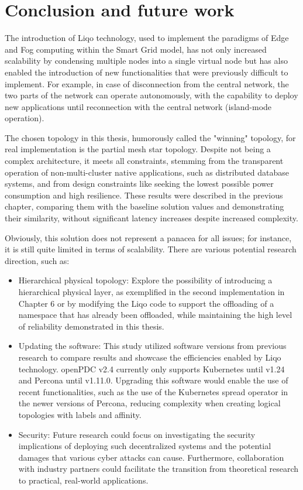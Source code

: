 \chapter{Conclusion and future work}
The introduction of Liqo technology, used to implement the paradigms of Edge and Fog computing within the Smart Grid model, has not only increased scalability by condensing multiple nodes into a single virtual node but has also enabled the introduction of new functionalities that were previously difficult to implement. For example, in case of disconnection from the central network, the two parts of the network can operate autonomously, with the capability to deploy new applications until reconnection with the central network (island-mode operation).

The chosen topology in this thesis, humorously called the "winning" topology, for real implementation is the partial mesh star topology. Despite not being a complex architecture, it meets all constraints, stemming from the transparent operation of non-multi-cluster native applications, such as distributed database systems, and from design constraints like seeking the lowest possible power consumption and high resilience. These results were described in the previous chapter, comparing them with the baseline solution values and demonstrating their similarity, without significant latency increases despite increased complexity.

Obviously, this solution does not represent a panacea for all issues; for instance, it is still quite limited in terms of scalability. There are various potential research direction, such as:

\begin{itemize}
\item Hierarchical physical topology: Explore the possibility of introducing a hierarchical physical layer, as exemplified in the second implementation in Chapter 6 or by modifying the Liqo code to support the offloading of a namespace that has already been offloaded, while maintaining the high level of reliability demonstrated in this thesis.
\item Updating the software: This study utilized software versions from previous research to compare results and showcase the efficiencies enabled by Liqo technology. openPDC v2.4 currently only supports Kubernetes until v1.24 and Percona until v1.11.0. Upgrading this software would enable the use of recent functionalities, such as the use of the Kubernetes spread operator in the newer versions of Percona, reducing complexity when creating logical topologies with labels and affinity. 
\item Security: Future research could focus on investigating the security implications of deploying such decentralized systems and the potential damages that various cyber attacks can cause. Furthermore, collaboration with industry partners could facilitate the transition from theoretical research to practical, real-world applications.
\end{itemize} 

